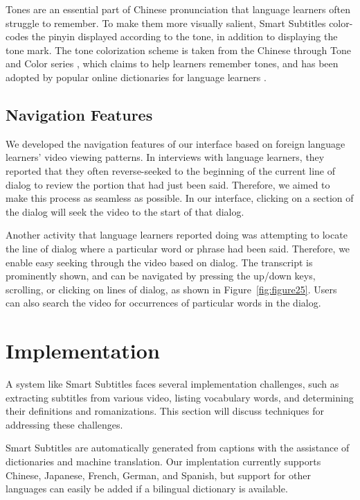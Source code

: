 \documentclass{sigchi}
\begin{document}
Tones are an essential part of Chinese pronunciation that language learners often struggle to remember. To make them more visually salient, Smart Subtitles color-codes the pinyin displayed according to the tone, in addition to displaying the tone mark. The tone colorization scheme is taken from the Chinese through Tone and Color series \cite{tonecolor}, which claims to help learners remember tones, and has been adopted by popular online dictionaries for language learners \cite{mdbg}.

\subsection{Navigation Features}

We developed the navigation features of our interface based
on foreign language learners’ video viewing patterns. In
interviews with language learners, they reported
that they often reverse-seeked to the beginning of the current
line of dialog to review the portion that had just been said.
Therefore, we aimed to make this process as seamless as possible.
In our interface, clicking on a section of the dialog will
seek the video to the start of that dialog.

Another activity that language learners reported doing was attempting to locate the line of dialog where a particular word or phrase had been said. Therefore, we enable easy seeking through the video based on dialog. The transcript is prominently shown, and can be navigated by pressing the up/down keys, scrolling, or clicking on lines of dialog, as shown in Figure~\ref{fig:figure25}. Users can also search the video for occurrences of particular words in the dialog.

\section{Implementation}

A system like Smart Subtitles faces several implementation challenges, such as extracting subtitles from various video, listing vocabulary words, and determining their definitions and romanizations. This section will discuss techniques for addressing these challenges.

Smart Subtitles are automatically generated from 
captions with the assistance of dictionaries and 
machine translation. Our implentation currently supports Chinese, Japanese, French, German, and Spanish, but support for other languages can easily be added if a bilingual dictionary is available.
\end{document}
